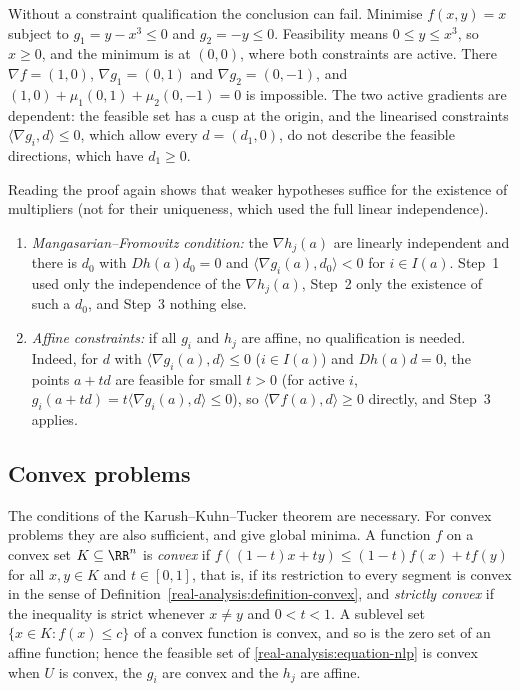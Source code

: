 \begin{counterexample}\label{real-analysis:counterexample-kkt}
Without a constraint qualification the conclusion can fail. Minimise $f(x, y) = x$ subject to $g_1 = y - x^3 \leq 0$ and $g_2 = -y \leq 0$. Feasibility means $0 \leq y \leq x^3$, so $x \geq 0$, and the minimum
is at $(0, 0)$, where both constraints are active. There $\nabla f = (1, 0)$, $\nabla g_1 = (0, 1)$ and $\nabla g_2 = (0, -1)$, and $(1, 0) + \mu_1(0, 1) + \mu_2(0, -1) = 0$ is impossible. The two active
gradients are dependent: the feasible set has a cusp at the origin, and the linearised constraints $\langle\nabla g_i, d\rangle \leq 0$, which allow every $d = (d_1, 0)$, do not describe the feasible
directions, which have $d_1 \geq 0$.
\end{counterexample}

\begin{remark}\label{real-analysis:remark-constraint-qualifications}
Reading the proof again shows that weaker hypotheses suffice for the existence of multipliers (not for their uniqueness, which used the full linear independence).
\begin{enumerate}
\item \emph{Mangasarian--Fromovitz condition:} the $\nabla h_j(a)$ are linearly independent and there is $d_0$ with $Dh(a)d_0 = 0$ and $\langle\nabla g_i(a), d_0\rangle < 0$ for $i \in I(a)$. Step~1
used only the independence of the $\nabla h_j(a)$, Step~2 only the existence of such a $d_0$, and Step~3 nothing else.
\item \emph{Affine constraints:} if all $g_i$ and $h_j$ are affine, no qualification is needed. Indeed, for $d$ with $\langle\nabla g_i(a), d\rangle \leq 0$ ($i \in I(a)$) and $Dh(a)d = 0$, the points
$a + td$ are feasible for small $t > 0$ (for active $i$, $g_i(a + td) = t\langle\nabla g_i(a), d\rangle \leq 0$), so $\langle\nabla f(a), d\rangle \geq 0$ directly, and Step~3 applies.
\end{enumerate}
\end{remark}

\subsection{Convex problems}\label{real-analysis:subsection-convex-problems}

The conditions of the Karush--Kuhn--Tucker theorem are necessary. For convex problems they are also sufficient, and give global minima. A function $f$ on a convex set $K \subseteq \RR^n$ is
\emph{convex} if $f((1 - t)x + ty) \leq (1 - t)f(x) + tf(y)$ for all $x, y \in K$ and $t \in [0, 1]$, that is, if its restriction to every segment is convex in the sense of
Definition~\ref{real-analysis:definition-convex}, and \emph{strictly convex} if the inequality is strict whenever $x \neq y$ and $0 < t < 1$. A sublevel set $\{x \in K : f(x) \leq c\}$ of a convex
function is convex, and so is the zero set of an affine function; hence the feasible set of \eqref{real-analysis:equation-nlp} is convex when $U$ is convex, the $g_i$ are convex and the $h_j$ are affine.

